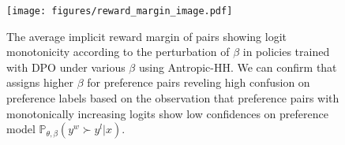 \begin{figure}[!t]
  \texttt{[image: figures/reward\_margin\_image.pdf]}
  \caption{The average implicit reward margin of pairs showing logit monotonicity according to the perturbation of $\beta$ in policies trained with DPO under various $\beta$ using Antropic-HH. We can confirm that \method{} assigns higher $\beta$ for preference pairs reveling high confusion on preference labels based on the observation that preference pairs with monotonically increasing logits show low confidences on preference model $\mathbb{P}_{\theta, \beta}(y^w \succ y^l | x)$.}
  \label{fig:reward_margin}
\end{figure}